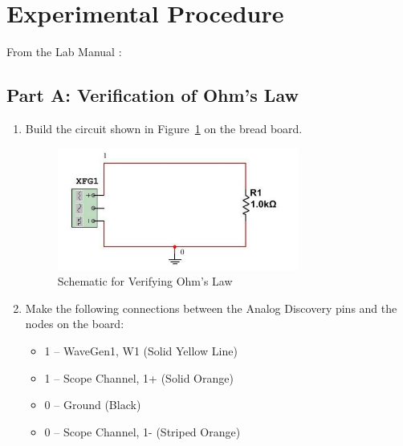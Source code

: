 \documentclass{article}
\begin{document}
  \section{Experimental Procedure}
  \label{sec:procedure}
  
From the Lab Manual \cite{manual} :
\subsection{Part A: Verification of Ohm's Law}
\label{sub:Procedure Part A}
\begin{enumerate}
  \item Build the circuit shown in Figure~\ref{fig:ohmschem}  on the bread board.
    \begin{figure}[!ht]
  \centering
  \caption{Schematic for Verifying Ohm's Law\label{fig:ohmschem}}
  \includegraphics[width=0.75\textwidth]{img/c1.png}
  \end{figure}

  \item Make the following connections between the Analog Discovery pins and the nodes on the
  board:
  \begin{itemize}
    \item 1 – WaveGen1, W1 (Solid Yellow Line)
    \item 1 – Scope Channel, 1+ (Solid Orange)
    \item 0 – Ground (Black)
    \item 0 – Scope Channel, 1- (Striped Orange)
  \end{itemize}


\end{enumerate}
\end{document}
